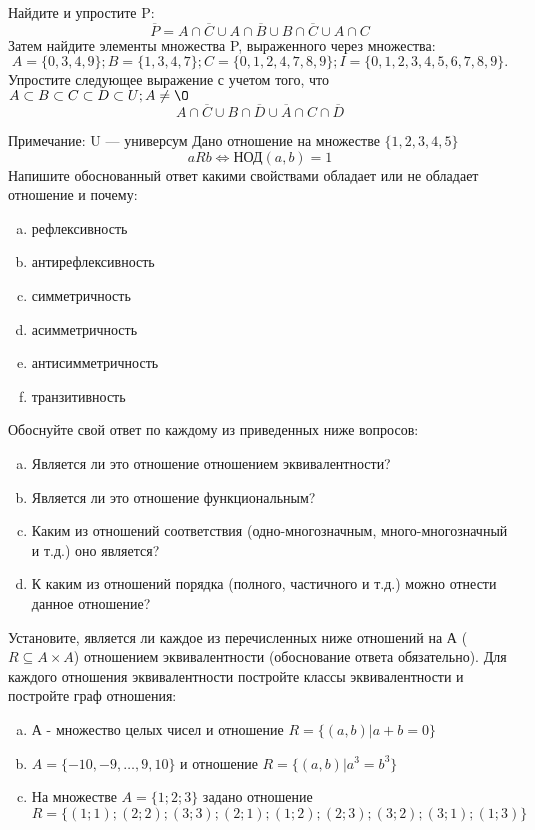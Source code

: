 \documentclass[10pt]{exam}
\begin{document}
\begin{questions}
\question
Найдите и упростите P:
\begin{equation*}
\overline{P} = A \cap \overline{C} \cup A \cap \overline{B} \cup B \cap \overline{C} \cup A \cap C
\end{equation*}
Затем найдите элементы множества P, выраженного через множества:
\begin{equation*}
A = \{0, 3, 4, 9\}; 
B = \{1, 3, 4, 7\};
C = \{0, 1, 2, 4, 7, 8, 9\};
I = \{0, 1, 2, 3, 4, 5, 6, 7, 8, 9\}.
\end{equation*}\question
Упростите следующее выражение с учетом того, что $A\subset B \subset C \subset D \subset U; A \neq \O$
\begin{equation*}
A \cap  \overline{C} \cup B \cap \overline{D} \cup  \overline{A} \cap C \cap  \overline{D}
\end{equation*}

Примечание: U — универсум\question
Дано отношение на множестве $\{1, 2, 3, 4, 5\}$ 
\begin{equation*}
aRb \iff  \text{НОД}(a,b) =1
\end{equation*}
Напишите обоснованный ответ какими свойствами обладает или не обладает отношение и почему:   
\begin{enumerate} [a)]\setcounter{enumi}{0}
\item рефлексивность
\item антирефлексивность
\item симметричность
\item асимметричность
\item антисимметричность
\item транзитивность
\end{enumerate}

Обоснуйте свой ответ по каждому из приведенных ниже вопросов:
\begin{enumerate} [a)]\setcounter{enumi}{0}
    \item Является ли это отношение отношением эквивалентности?
    \item Является ли это отношение функциональным?
    \item Каким из отношений соответствия (одно-многозначным, много-многозначный и т.д.) оно является?
    \item К каким из отношений порядка (полного, частичного и т.д.) можно отнести данное отношение?
\end{enumerate}


\question
Установите, является ли каждое из перечисленных ниже отношений на А ($R \subseteq A \times A$) отношением эквивалентности (обоснование ответа обязательно). Для каждого отношения эквивалентности 
постройте классы эквивалентности и постройте граф отношения:
\begin{enumerate}[a)]\setcounter{enumi}{0}
\item А - множество целых чисел и отношение $R = \{(a,b)|a + b = 0\}$
\item $A = \{-10, -9, …, 9, 10\}$ и отношение $R = \{(a,b)|a^{3} = b^{3}\}$
\item На множестве $A = \{1; 2; 3\}$ задано отношение $R = \{(1; 1); (2; 2); (3; 3); (2; 1); (1; 2); (2; 3); (3; 2); (3; 1); (1; 3)\}$


\end{enumerate}
\end{questions}
\end{document}
